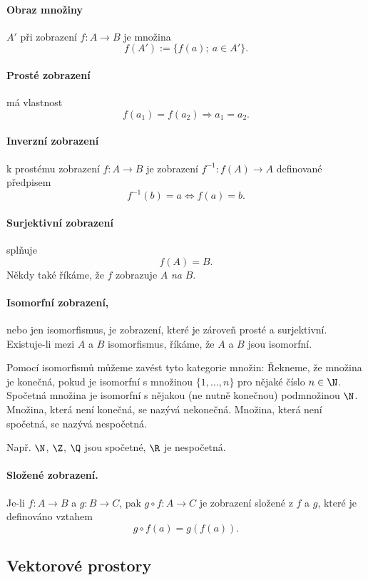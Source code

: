 \paragraph{Obraz množiny} $A'$ při zobrazení $f:A\to B$ je množina
$$ f(A'):=\{f(a);~a\in A'\}. $$

\paragraph{Prosté zobrazení} má vlastnost
$$ f(a_1)=f(a_2) \Rightarrow a_1=a_2. $$

\paragraph{Inverzní zobrazení} k prostému zobrazení $f:A\to B$ je zobrazení $f^{-1}:f(A)\to A$ definované předpisem
$$ f^{-1}(b)=a \Leftrightarrow f(a)=b. $$

\paragraph{Surjektivní zobrazení} splňuje
$$ f(A)=B. $$
Někdy také říkáme, že $f$ zobrazuje $A$ \emph{na} $B$.

\paragraph{Isomorfní zobrazení,} nebo jen isomorfismus, je zobrazení, které je zároveň prosté a surjektivní.
Existuje-li mezi $A$ a $B$ isomorfismus, říkáme, že $A$ a $B$ jsou isomorfní.

Pomocí isomorfismů můžeme zavést tyto kategorie množin:
Řekneme, že množina je konečná, pokud je isomorfní s množinou $\{1,\ldots,n\}$ pro nějaké číslo $n\in\N$.
Spočetná množina je isomorfní s nějakou (ne nutně konečnou) podmnožinou $\N$.
Množina, která není konečná, se nazývá nekonečná.
Množina, která není spočetná, se nazývá nespočetná.

Např. $\N$, $\Z$, $\Q$ jsou spočetné, $\R$ je nespočetná.

\paragraph{Složené zobrazení.} Je-li $f:A\to B$ a $g:B\to C$, pak $g\circ f:A\to C$ je zobrazení složené z $f$ a $g$, které je definováno vztahem
$$ g\circ f(a) = g(f(a)). $$


\subsection{Vektorové prostory}

